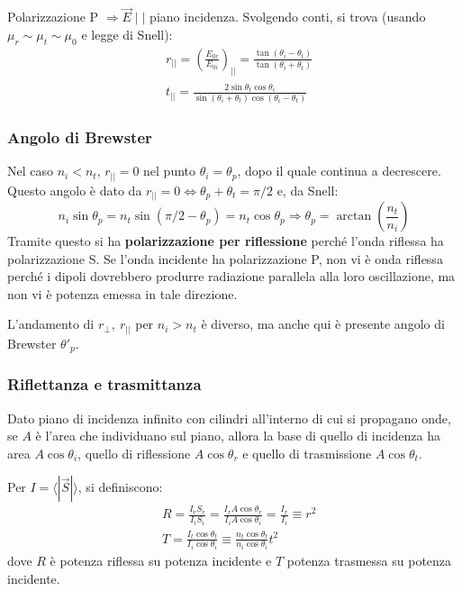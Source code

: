 \documentclass[a4paper]{scrartcl}
\numberwithin{equation}{subsection}
\theoremstyle{style1}
\begin{document}
Polarizzazione P $\Rightarrow \vec{E}  \mid   \mid $ piano incidenza. Svolgendo conti, si trova (usando $\mu _r\sim\mu _t \sim\mu _0$ e legge di Snell):
\begin{equation}
	\begin{split}
		&r_{| |} = \left(\frac{E_{0r} }{E_{0i} }\right) _{| |} = \frac{\tan(\theta _i - \theta _t)}{\tan (\theta _i + \theta _t)}  \\
		&t_{| | } = \frac{2 \sin \theta _t \cos \theta _i}{\sin( \theta_i + \theta _t) \cos(\theta _i - \theta _t) } 
	\end{split}
\end{equation}
\subsubsection{Angolo di Brewster}

Nel caso $n_i < n_t$, $r_{ | |} =0 $ nel punto $\theta _i = \theta _p$, dopo il quale continua a decrescere. Questo angolo \`e dato da $r_{| |} =0 \iff\theta _p + \theta _t = \pi/2 $ e, da Snell:
\begin{equation}
	n_i \sin \theta _p = n_t \sin(\pi / 2 - \theta _p) = n_t \cos \theta _p \Rightarrow \theta _p = \arctan \left(\frac{n_t}{n_i}\right) 
\end{equation}
Tramite questo si ha \textbf{polarizzazione per riflessione} perch\'e l'onda riflessa ha polarizzazione S. Se l'onda incidente ha polarizzazione P, non vi \`e onda riflessa perch\'e i dipoli dovrebbero produrre radiazione parallela alla loro oscillazione, ma non vi \`e potenza emessa in tale direzione.

L'andamento di $r_\perp, \ r_{| | } $ per $n_i > n_t$ \`e diverso, ma anche qui \`e presente angolo di Brewster $\theta' _p$.
\subsubsection{Riflettanza e trasmittanza}

Dato piano di incidenza infinito con cilindri all'interno di cui si propagano onde, se $A$ \`e l'area che individuano sul piano, allora la base di quello di incidenza ha area $A\cos \theta _i$, quello di riflessione $A \cos \theta _r$ e quello di trasmissione $A \cos\theta _t$. 

Per $I = \langle |\vec{S}| \rangle$, si definiscono:
\begin{equation}
	\begin{split}
		&R = \frac{I_r S_r}{I_i S_i} = \frac{I_r A\cos \theta _r}{I_i A\cos \theta _i} = \frac{I_r}{I_i} \equiv r^2\\
		&T = \frac{I_t\cos\theta _t}{I_i \cos\theta _i} \equiv \frac{n_t \cos\theta _t}{n_i \cos\theta _i}t^2
	\end{split}
\end{equation}
dove $R$ \`e potenza riflessa su potenza incidente e $T$ potenza trasmessa su potenza incidente.
\end{document}
